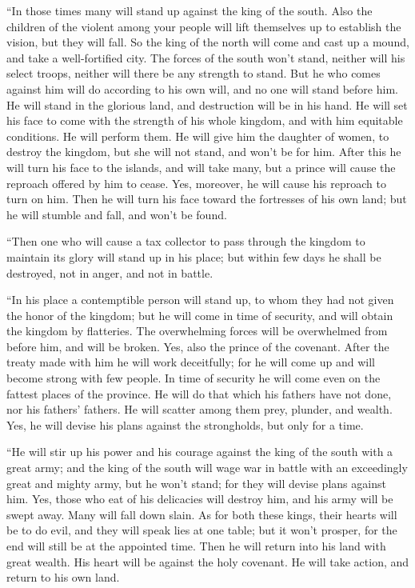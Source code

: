  ``In those times many will stand up against the king of
the south. Also the children of the violent among your people will lift
themselves up to establish the vision, but they will fall.
 So the king of the north will come and cast up a mound,
and take a well-fortified city. The forces of the south won't stand,
neither will his select troops, neither will there be any strength to
stand.  But he who comes against him will do according to
his own will, and no one will stand before him. He will stand in the
glorious land, and destruction will be in his hand.  He
will set his face to come with the strength of his whole kingdom, and
with him equitable conditions. He will perform them. He will give him
the daughter of women, to destroy the kingdom, but she will not stand,
and won't be for him.  After this he will turn his face
to the islands, and will take many, but a prince will cause the reproach
offered by him to cease. Yes, moreover, he will cause his reproach to
turn on him.  Then he will turn his face toward the
fortresses of his own land; but he will stumble and fall, and won't be
found.

 ``Then one who will cause a tax collector to pass
through the kingdom to maintain its glory will stand up in his place;
but within few days he shall be destroyed, not in anger, and not in
battle.

 ``In his place a contemptible person will stand up, to
whom they had not given the honor of the kingdom; but he will come in
time of security, and will obtain the kingdom by flatteries.
 The overwhelming forces will be overwhelmed from before
him, and will be broken. Yes, also the prince of the covenant.
 After the treaty made with him he will work deceitfully;
for he will come up and will become strong with few people.
 In time of security he will come even on the fattest
places of the province. He will do that which his fathers have not done,
nor his fathers' fathers. He will scatter among them prey, plunder, and
wealth. Yes, he will devise his plans against the strongholds, but only
for a time.

 ``He will stir up his power and his courage against the
king of the south with a great army; and the king of the south will wage
war in battle with an exceedingly great and mighty army, but he won't
stand; for they will devise plans against him.  Yes,
those who eat of his delicacies will destroy him, and his army will be
swept away. Many will fall down slain.  As for both these
kings, their hearts will be to do evil, and they will speak lies at one
table; but it won't prosper, for the end will still be at the appointed
time.  Then he will return into his land with great
wealth. His heart will be against the holy covenant. He will take
action, and return to his own land.

